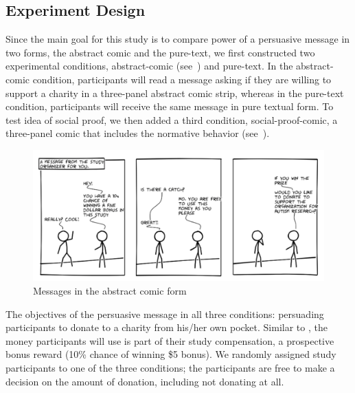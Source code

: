 \subsection{Experiment Design}
Since the main goal for this study is to compare power of a persuasive message in two forms, the abstract comic and the pure-text, we first constructed two experimental conditions, abstract-comic (see~) and pure-text. In the abstract-comic condition, participants will read a message asking if they are willing to support a charity in a three-panel abstract comic strip, whereas in the pure-text condition, participants will receive the same message in pure textual form. To test idea of social proof, we then added a third condition, social-proof-comic, a three-panel comic that includes the normative behavior (see~).

\begin{figure}[bt]
	\centering
	\includegraphics[width=\columnwidth]{./figures/abstract_comic.png}
	\caption{Messages in the abstract comic form}
	\label{fig:basic three comic panel}
\end{figure}

The objectives of the persuasive message in all three conditions: persuading participants to donate to a charity from his/her own pocket. Similar to \textcite{lee2013does}, the money participants will use is part of their study compensation, a prospective bonus reward (10\% chance of winning \$5 bonus). We randomly assigned study participants to one of the three conditions; the participants are free to make a decision on the amount of donation, including not donating at all.

